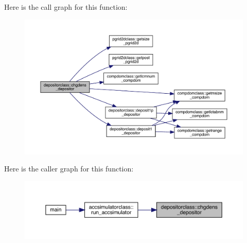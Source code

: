 Here is the call graph for this function\+:\nopagebreak
\begin{figure}[H]
\begin{center}
\leavevmode
\includegraphics[width=350pt]{namespacedepositorclass_adea4a5f5ed3c85a2ef236eaa94f10b98_cgraph}
\end{center}
\end{figure}
Here is the caller graph for this function\+:\nopagebreak
\begin{figure}[H]
\begin{center}
\leavevmode
\includegraphics[width=350pt]{namespacedepositorclass_adea4a5f5ed3c85a2ef236eaa94f10b98_icgraph}
\end{center}
\end{figure}
\mbox{\label{namespacedepositorclass_a258e6305ffaed5752f7eaa0584e2e6d8}} 
